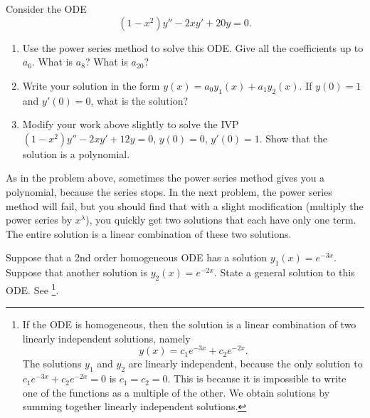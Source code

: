 \begin{problem}
 Consider the ODE $$(1-x^2)y'' - 2xy'+20y=0.$$
\begin{enumerate}
 \item Use the power series method to solve this ODE. Give all the coefficients up to $a_6$.  What is $a_{8}$? What is $a_{20}$? 
 \item Write your solution in the form $y(x) = a_0y_1(x)+a_1y_2(x)$. If $y(0)=1$ and $y'(0)=0$, what is the solution?
 \item Modify your work above slightly to solve the IVP $(1-x^2)y'' - 2xy'+12y=0$, $y(0)=0$, $y'(0)=1$.  Show that the solution is a polynomial. 
\end{enumerate}
 
\end{problem}

As in the problem above, sometimes the power series method gives you a polynomial, because the series stops. In the next problem, the power series method will fail, but you should find that with a slight modification (multiply the power series by $x^\lambda$), you quickly get two solutions that each have only one term. The entire solution is a linear combination of these two solutions.

\begin{review*}
 Suppose that a 2nd order homogeneous ODE has a solution $y_1(x) = e^{-3x}$.  Suppose that another solution is $y_2(x) = e^{-2x}$. State a general solution to this ODE. See \footnote{
If the ODE is homogeneous, then the solution is a linear combination of two linearly independent solutions, namely 
$$y(x) =c_1e^{-3x}+c_2e^{-2x}.$$ 
The solutions $y_1$ and $y_2$ are linearly independent, because the only solution to $c_1 e^{-3x}+c_2e^{-2x}=0$ is $c_1=c_2=0$.  This is because it is impossible to write one of the functions as a multiple of the other.
We obtain solutions by summing together linearly independent solutions.
}. 
\end{review*}


